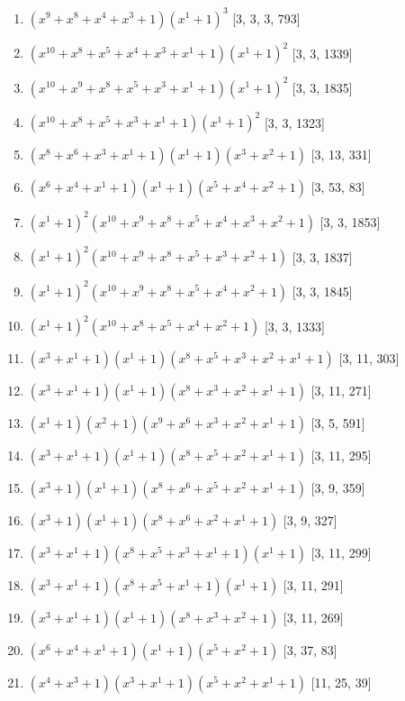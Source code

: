 \documentclass[10pt,twocolumn]{article}
\begin{document}
\begin{enumerate}
\item $(x^{9} + x^{8} + x^{4} + x^{3} + 1)(x^{1} + 1)^{3}$  [3, 3, 3, 793]
\item $(x^{10} + x^{8} + x^{5} + x^{4} + x^{3} + x^{1} + 1)(x^{1} + 1)^{2}$  [3, 3, 1339]
\item $(x^{10} + x^{9} + x^{8} + x^{5} + x^{3} + x^{1} + 1)(x^{1} + 1)^{2}$  [3, 3, 1835]
\item $(x^{10} + x^{8} + x^{5} + x^{3} + x^{1} + 1)(x^{1} + 1)^{2}$  [3, 3, 1323]
\item $(x^{8} + x^{6} + x^{3} + x^{1} + 1)(x^{1} + 1)(x^{3} + x^{2} + 1)$  [3, 13, 331]
\item $(x^{6} + x^{4} + x^{1} + 1)(x^{1} + 1)(x^{5} + x^{4} + x^{2} + 1)$  [3, 53, 83]
\item $(x^{1} + 1)^{2}(x^{10} + x^{9} + x^{8} + x^{5} + x^{4} + x^{3} + x^{2} + 1)$  [3, 3, 1853]
\item $(x^{1} + 1)^{2}(x^{10} + x^{9} + x^{8} + x^{5} + x^{3} + x^{2} + 1)$  [3, 3, 1837]
\item $(x^{1} + 1)^{2}(x^{10} + x^{9} + x^{8} + x^{5} + x^{4} + x^{2} + 1)$  [3, 3, 1845]
\item $(x^{1} + 1)^{2}(x^{10} + x^{8} + x^{5} + x^{4} + x^{2} + 1)$  [3, 3, 1333]
\item $(x^{3} + x^{1} + 1)(x^{1} + 1)(x^{8} + x^{5} + x^{3} + x^{2} + x^{1} + 1)$  [3, 11, 303]
\item $(x^{3} + x^{1} + 1)(x^{1} + 1)(x^{8} + x^{3} + x^{2} + x^{1} + 1)$  [3, 11, 271]
\item $(x^{1} + 1)(x^{2} + 1)(x^{9} + x^{6} + x^{3} + x^{2} + x^{1} + 1)$  [3, 5, 591]
\item $(x^{3} + x^{1} + 1)(x^{1} + 1)(x^{8} + x^{5} + x^{2} + x^{1} + 1)$  [3, 11, 295]
\item $(x^{3} + 1)(x^{1} + 1)(x^{8} + x^{6} + x^{5} + x^{2} + x^{1} + 1)$  [3, 9, 359]
\item $(x^{3} + 1)(x^{1} + 1)(x^{8} + x^{6} + x^{2} + x^{1} + 1)$  [3, 9, 327]
\item $(x^{3} + x^{1} + 1)(x^{8} + x^{5} + x^{3} + x^{1} + 1)(x^{1} + 1)$  [3, 11, 299]
\item $(x^{3} + x^{1} + 1)(x^{8} + x^{5} + x^{1} + 1)(x^{1} + 1)$  [3, 11, 291]
\item $(x^{3} + x^{1} + 1)(x^{1} + 1)(x^{8} + x^{3} + x^{2} + 1)$  [3, 11, 269]
\item $(x^{6} + x^{4} + x^{1} + 1)(x^{1} + 1)(x^{5} + x^{2} + 1)$  [3, 37, 83]
\item $(x^{4} + x^{3} + 1)(x^{3} + x^{1} + 1)(x^{5} + x^{2} + x^{1} + 1)$  [11, 25, 39]

\end{enumerate}
\end{document}
